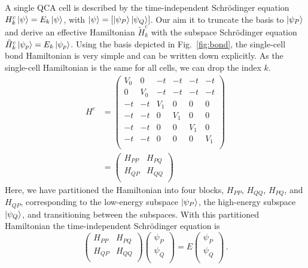 A single QCA cell is described by the time-independent Schr\"odinger equation
$H^c_k \left|\psi\right> = E_k \left|\psi\right>$, with $\left|\psi\right> = \left[ \left|\psi_P\right>
\left|\psi_Q\right> \right]$. Our aim it to truncate the basis to $\left|\psi_P\right>$ and
derive an effective Hamiltonian $\tilde{H}^c_k$ with the subspace
Schr\"odinger equation $\tilde{H}^c_k \left|\psi_p\right> = E_k \left|\psi_p\right>$. Using
the basis depicted in Fig.~\ref{fig:bond}, the single-cell bond Hamiltonian is
very simple and can be written down explicitly. As the single-cell Hamiltonian
is the same for all cells, we can drop the index $k$.
%
\begin{equation}
\begin{split}
  \label{eq:H_marix}
  H^c
  &=
  \left(
  \begin{array}{cc|cccc}
    V_0 & 0   & -t  & -t  & -t  & -t  \\
    0   & V_0 & -t  & -t  & -t  & -t  \\
    \hline
    -t  & -t  & V_1 & 0   & 0   & 0   \\
    -t  & -t  & 0   & V_1 & 0   & 0   \\
    -t  & -t  & 0   & 0   & V_1 & 0   \\
    -t  & -t  & 0   & 0   & 0   & V_1 \\
  \end{array}
  \right) \\[1em]
  &=
  \left(
  \begin{array}{cc}
    H_{PP} & H_{PQ} \\
    H_{QP} & H_{QQ} \\
  \end{array}
  \right)
\end{split}
\end{equation}
%
Here, we have partitioned the Hamiltonian into four blocks, $H_{PP}$, $H_{QQ}$,
$H_{PQ}$, and $H_{QP}$, corresponding to the low-energy subspace $\left|\psi_P\right>$,
the high-energy subspace $\left|\psi_Q\right>$, and transitioning between the subspaces.
With this partitioned Hamiltonian the time-independent Schr\"odinger equation is
%
\begin{equation}
  \label{eq:SE}
  \begin{pmatrix}
    H_{PP} & H_{PQ} \\
    H_{QP} & H_{QQ} \\
  \end{pmatrix}
  \begin{pmatrix}
    \psi_P \\
    \psi_Q \\
  \end{pmatrix}
  =
  E
  \begin{pmatrix}
    \psi_P \\
    \psi_Q \\
  \end{pmatrix}
  \, .
\end{equation}
